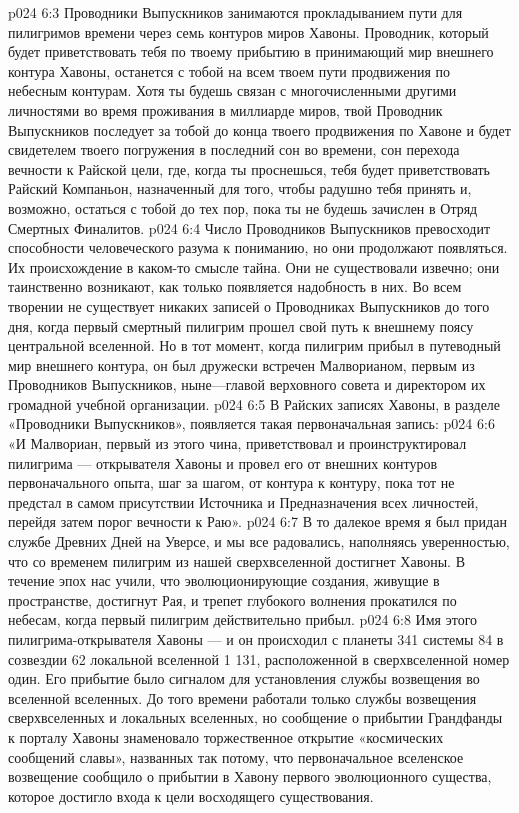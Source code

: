 \vs p024 6:3 Проводники Выпускников занимаются прокладыванием пути для пилигримов времени через семь контуров миров Хавоны. Проводник, который будет приветствовать тебя по твоему прибытию в принимающий мир внешнего контура Хавоны, останется с тобой на всем твоем пути продвижения по небесным контурам. Хотя ты будешь связан с многочисленными другими личностями во время проживания в миллиарде миров, твой Проводник Выпускников последует за тобой до конца твоего продвижения по Хавоне и будет свидетелем твоего погружения в последний сон во времени, сон перехода вечности к Райской цели, где, когда ты проснешься, тебя будет приветствовать Райский Компаньон, назначенный для того, чтобы радушно тебя принять и, возможно, остаться с тобой до тех пор, пока ты не будешь зачислен в Отряд Смертных Финалитов.
\vs p024 6:4 \pc Число Проводников Выпускников превосходит способности человеческого разума к пониманию, но они продолжают появляться. Их происхождение в каком\hyp{}то смысле тайна. Они не существовали извечно; они таинственно возникают, как только появляется надобность в них. Во всем творении не существует никаких записей о Проводниках Выпускников до того дня, когда первый смертный пилигрим прошел свой путь к внешнему поясу центральной вселенной. Но в тот момент, когда пилигрим прибыл в путеводный мир внешнего контура, он был дружески встречен Малворианом, первым из Проводников Выпускников, ныне---главой верховного совета и директором их громадной учебной организации.
\vs p024 6:5 В Райских записях Хавоны, в разделе «Проводники Выпускников», появляется такая первоначальная запись:
\vs p024 6:6 «И Малвориан, первый из этого чина, приветствовал и проинструктировал пилигрима --- открывателя Хавоны и провел его от внешних контуров первоначального опыта, шаг за шагом, от контура к контуру, пока тот не предстал в самом присутствии Источника и Предназначения всех личностей, перейдя затем порог вечности к Раю».
\vs p024 6:7 В то далекое время я был придан службе Древних Дней на Уверсе, и мы все радовались, наполняясь уверенностью, что со временем пилигрим из нашей сверхвселенной достигнет Хавоны. В течение эпох нас учили, что эволюционирующие создания, живущие в пространстве, достигнут Рая, и трепет глубокого волнения прокатился по небесам, когда первый пилигрим действительно прибыл.
\vs p024 6:8 \pc Имя этого пилигрима\hyp{}открывателя Хавоны ---  и он происходил с планеты 341 системы 84 в созвездии 62 локальной вселенной 1 131, расположенной в сверхвселенной номер один. Его прибытие было сигналом для установления службы возвещения во вселенной вселенных. До того времени работали только службы возвещения сверхвселенных и локальных вселенных, но сообщение о прибытии Грандфанды к порталу Хавоны знаменовало торжественное открытие «космических сообщений славы», названных так потому, что первоначальное вселенское возвещение сообщило о прибытии в Хавону первого эволюционного существа, которое достигло входа к цели восходящего существования.
